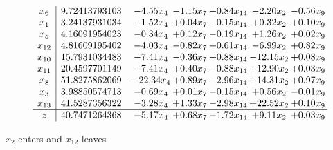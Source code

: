 \documentclass[9pt]{article}
\begin{document}
 \[\begin{array}{c| c c@{\hskip 2pt} c@{\hskip 2pt} c@{\hskip 2pt} c@{\hskip 2pt} c@{\hskip 2pt} }
 x_{6}   &  9.72413793103 & -4.55 x_{4} & -1.15 x_{7} & +  0.84 x_{14} & -2.20 x_{2} & -0.56 x_{9}\\
 x_{1}   &  3.24137931034 & -1.52 x_{4} & +  0.04 x_{7} & -0.15 x_{14} & +  0.32 x_{2} & +  0.10 x_{9}\\
 x_{5}   &  4.16091954023 & -0.34 x_{4} & +  0.12 x_{7} & -0.19 x_{14} & +  1.26 x_{2} & +  0.02 x_{9}\\
 x_{12}   &  4.81609195402 & -4.03 x_{4} & -0.82 x_{7} & +  0.61 x_{14} & -6.99 x_{2} & +  0.82 x_{9}\\
 x_{10}   &  15.7931034483 & -7.41 x_{4} & -0.36 x_{7} & +  0.88 x_{14} & -12.15 x_{2} & +  0.08 x_{9}\\
 x_{11}   &  20.4597701149 & -7.41 x_{4} & +  0.40 x_{7} & -0.88 x_{14} & + 12.90 x_{2} & +  0.03 x_{9}\\
 x_{8}   &  51.8275862069 & -22.34 x_{4} & +  0.89 x_{7} & -2.96 x_{14} & + 14.31 x_{2} & +  0.97 x_{9}\\
 x_{3}   &  3.98850574713 & -0.69 x_{4} & +  0.01 x_{7} & -0.15 x_{14} & +  0.56 x_{2} & -0.01 x_{9}\\
 x_{13}   &  41.5287356322 & -3.28 x_{4} & +  1.33 x_{7} & -2.98 x_{14} & + 22.52 x_{2} & +  0.10 x_{9}\\
\hline
z    &  40.7471264368 & -5.17 x_{4} & +  0.68 x_{7} & -1.72 x_{14} & +  9.11 x_{2} & +  0.03 x_{9}\\
\end{array}\]


 $ x_{2} $ enters and $ x_{12} $ leaves 
\end{document}
